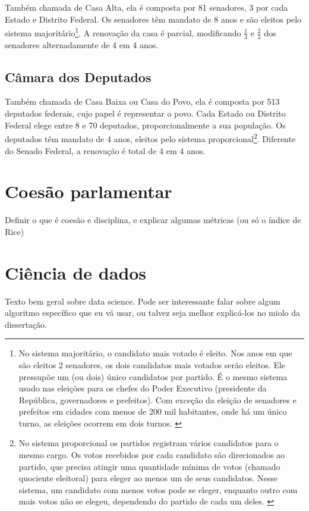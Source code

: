 \documentclass[a4paper,titlepage]{ppgi}\usepackage[]{graphicx}\usepackage[]{color}
\begin{document}
Também chamada de Casa Alta, ela é composta por 81 senadores, 3 por cada Estado e Distrito Federal. Os senadores têm mandato de 8 anos e são eleitos pelo sistema majoritário\footnote{No sistema majoritário, o candidato mais votado é eleito. Nos anos em que são eleitos 2 senadores, os dois candidatos mais votados serão eleitos. Ele pressupõe um (ou dois) único candidatos por partido. É o mesmo sistema usado nas eleições para os chefes do Poder Executivo (presidente da República, governadores e prefeitos). Com exceção da eleição de senadores e prefeitos em cidades com menos de 200 mil habitantes, onde há um único turno, as eleições ocorrem em dois turnos. \cite{Netto2013}}. A renovação da casa é parcial, modificando $\frac{1}{3}$ e $\frac{2}{3}$ dos senadores alternadamente de 4 em 4 anos.

\subsection{Câmara dos Deputados}

Também chamada de Casa Baixa ou Casa do Povo, ela é composta por 513 deputados federais, cujo papel é representar o povo. Cada Estado ou Distrito Federal elege entre 8 e 70 deputados, proporcionalmente a sua população. Os deputados têm mandato de 4 anos, eleitos pelo sistema proporcional\footnote{No sistema proporcional os partidos registram vários candidatos para o mesmo cargo. Os votos recebidos por cada candidato são direcionados ao partido, que precisa atingir uma quantidade mínima de votos (chamado quociente eleitoral) para eleger ao menos um de seus candidatos. Nesse sistema, um candidato com menos votos pode se eleger, enquanto outro com mais votos não se elegeu, dependendo do partido de cada um deles. \cite{Netto2013,Bramatti2014}}. Diferente do Senado Federal, a renovação é total de 4 em 4 anos.

\section{Coesão parlamentar}

Definir o que é coesão e disciplina, e explicar algumas métricas (ou só o índice de Rice)


\section{Ciência de dados}

Texto bem geral sobre data science. Pode ser interessante falar sobre algum algoritmo específico que eu vá usar, ou talvez seja melhor explicá-los no miolo da dissertação.
\end{document}
